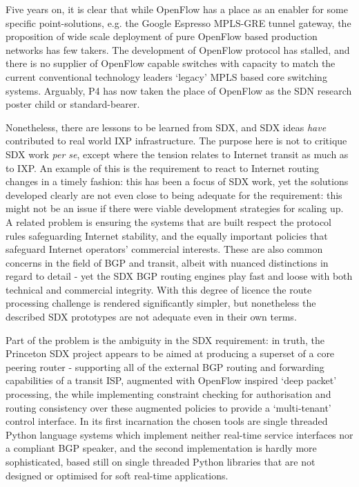 Five years on, it is clear that while OpenFlow has a place as an enabler for some specific point-solutions, e.g. the Google Espresso MPLS-GRE tunnel gateway, the proposition of wide scale deployment of pure OpenFlow based production networks has few takers. The development of OpenFlow protocol has stalled, and there is no supplier of OpenFlow capable switches with capacity to match the current conventional technology leaders `legacy' MPLS based core switching systems.
Arguably, P4 has now taken the place of OpenFlow as the SDN research poster child or standard-bearer.


\medskip

Nonetheless, there are lessons to be learned from SDX, and SDX ideas \emph{have} contributed to real world IXP infrastructure.
The purpose here is not to critique SDX work \emph{per se}, except where the tension relates to Internet transit as much as to IXP.
An example of this is the requirement to react to Internet routing changes in a timely fashion: this has been a focus of SDX work, yet the solutions developed clearly are not even close to being adequate for the requirement: this might not be an issue if there were viable development strategies for scaling up.
A related problem is ensuring the systems that are built respect the protocol rules safeguarding Internet stability, and the equally important policies that safeguard Internet operators' commercial interests.
These are also common concerns in the field of BGP and transit, albeit with nuanced distinctions in regard to detail - yet the SDX BGP routing engines play fast and loose with both technical and commercial integrity.
With this degree of licence the route processing challenge is rendered significantly simpler, but nonetheless the described SDX prototypes are not adequate even in their own terms.

\medskip


Part of the problem is the ambiguity in the SDX requirement: in truth, the Princeton SDX project appears to be aimed at producing a superset of a core peering router - supporting all of the external BGP routing and forwarding capabilities of a transit ISP, augmented with OpenFlow inspired `deep packet' processing, the while implementing constraint checking for authorisation and routing consistency over these augmented policies to provide a `multi-tenant' control interface.
In its first incarnation the chosen tools are single threaded Python language systems which implement neither real-time service interfaces nor a compliant BGP speaker, and the second implementation is hardly more sophisticated, based still on single threaded Python libraries that are not designed or optimised for soft real-time applications.



